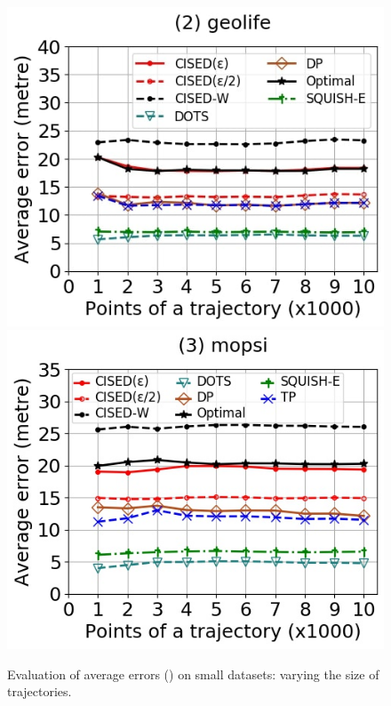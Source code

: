 {\begin{figure}[tb!]
	\includegraphics[scale=0.250]{Figures/Exp-SED-error-size-geolife.jpg}	\hspace{0.5ex}
	\includegraphics[scale=0.348]{Figures/Exp-SED-error-size-mopsi.jpg}		
	\vspace{-2ex}
	\caption{\small Evaluation of average errors (\sed) on small datasets: varying the size of
		trajectories.}
	\label{fig:ae-sed-size}
	\vspace{-2ex}
\end{figure}
\begin{figure}[tb!]

\end{figure}}
